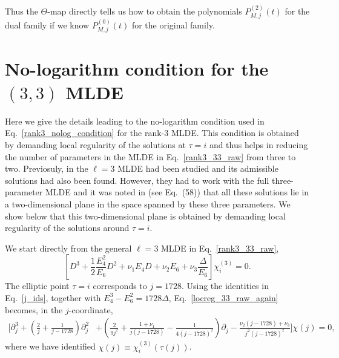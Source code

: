 \documentclass[11pt]{article}
\begin{document}
Thus the $\Theta$-map directly tells us how to obtain the polynomials $ P^{(2)}_{M,j}(t)$ for the dual family if we know  $P^{(0)}_{M,j}(t)$ for the original family.

\section{No-logarithm condition for the \((3,3)\) MLDE}\label{app:loc_reg}

Here we give the details leading to the no-logarithm condition used in Eq.~\eqref{rank3_nolog_condition} for the rank-3 MLDE. This condition is obtained by demanding local regularity of the solutions at $\tau=i$ and thus helps in reducing the number of parameters in the MLDE in Eq.~\eqref{rank3_33_raw} from three to two. Previosuly, in \cite{Gowdigere:2023xnm, Govindarajan:2025jlq} the $\ell=3$ MLDE had been studied and its admissible solutions had also been found. However, they had to work with the full three-parameter MLDE and it was noted in \cite{Gowdigere:2023xnm} (see Eq.~(58)) that all these solutions lie in a two-dimensional plane in the space spanned by these three parameters. We show below that this two-dimensional plane is obtained by demanding local regularity of the solutions around $\tau=i$.

We start directly from the general $\ell=3$ MLDE in Eq.~\eqref{rank3_33_raw},
\begin{equation}
\left[
D^3+\frac{1}{2}\frac{E_4^2}{E_6}D^2+\nu_1E_4D
+\nu_2E_6+\nu_3\frac{\Delta}{E_6}
\right]\chi_i^{(3)}=0 .
\label{locreg_33_raw_again}
\end{equation}
The elliptic point \(\tau= i\) corresponds to \(j=1728\). Using the identities
in Eq.~\eqref{j_ids}, together with \(E_4^3-E_6^2=1728\Delta\),
Eq.~\eqref{locreg_33_raw_again} becomes, in the \(j\)-coordinate,
\begin{equation}
\begin{split}
\Bigg[
\partial_j^3
+\left(\frac{2}{j}+\frac{1}{j-1728}\right)\partial_j^2
&+\left(
\frac{2}{9j^2}
+\frac{1+\nu_1}{j(j-1728)}
-\frac{1}{4(j-1728)^2}
\right)\partial_j  -\frac{\nu_2(j-1728)+\nu_3}{j^2(j-1728)^2}
\Bigg]\chi(j)=0 ,
\end{split}
\label{locreg_33_jcoord}
\end{equation}
where we have identified \(\chi(j)\equiv\chi_i^{(3)}(\tau(j))\).
\end{document}
